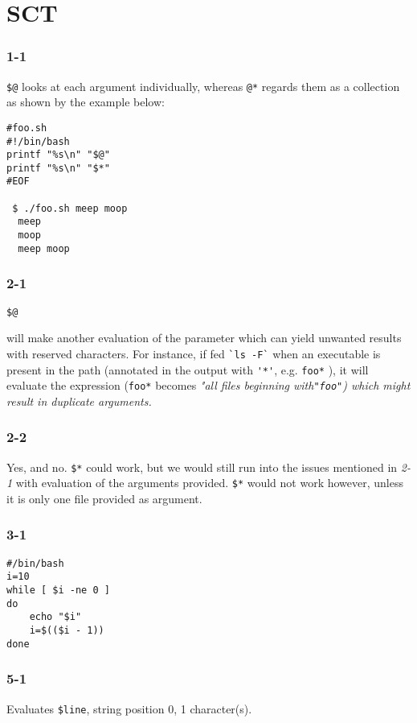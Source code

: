 \chapter{SCT}
\subsection{1-1}
 \verb=$@= looks at each argument individually, whereas \verb=@*= regards them as a collection as shown by the example below:

\begin{verbatim}
#foo.sh
#!/bin/bash
printf "%s\n" "$@"
printf "%s\n" "$*"
#EOF

 $ ./foo.sh meep moop
  meep
  moop
  meep moop
\end{verbatim}

\subsection{2-1}
\begin{verbatim}$@\end{verbatim} will make another evaluation of the parameter which can yield unwanted results with reserved characters. For instance, if fed \verb=`ls -F`= when an executable is present in the path (annotated in the output with \verb='*'=, e.g. \verb=foo*= ), it will evaluate the expression (\verb=foo*= becomes \em"all files beginning with\em \verb="foo"=) which might result in duplicate arguments.

\subsection{2-2}
Yes, and no. \verb=$*= could work, but we would still run into the issues mentioned in \emph{2-1} with evaluation of the arguments provided. \verb=$*= would not work however, unless it is only one file provided as argument.

\subsection{3-1}
\begin{verbatim}
#/bin/bash
i=10
while [ $i -ne 0 ]
do
    echo "$i"
    i=$(($i - 1))
done
\end{verbatim}

\subsection{5-1}
Evaluates \verb=$line=, string position 0, 1 character(s).

